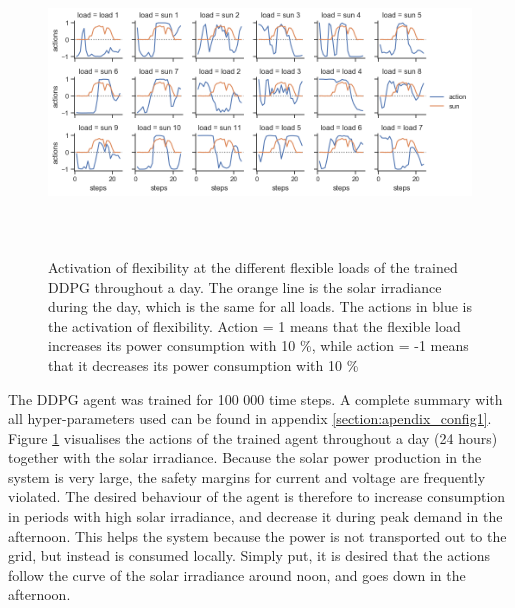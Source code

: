 \documentclass[class=book, crop=false]{standalone}
\begin{document}
\begin{figure}[h]
    \center
    \includegraphics[height=8cm, width=15cm]{figures/configuration1.png}
    \caption[size = 9]{Activation of flexibility at the different flexible loads of the trained DDPG throughout a day. The orange line is the solar irradiance during the day, which is the same for all loads. The actions in blue is the activation of flexibility. Action = 1 means that the flexible load increases its power consumption with 10 \%, while action = -1 means that it decreases its power consumption with 10 \%}
    \label{fig:results:configuration1}
\end{figure}

The DDPG agent was trained for 100 000 time steps. A complete summary with all hyper-parameters used can be found in appendix \ref{section:apendix_config1}. Figure \ref{fig:results:configuration1} visualises the actions of the trained agent throughout a day (24 hours) together with the solar irradiance. Because the solar power production in the system is very large, the safety margins for current and voltage are frequently violated. The desired behaviour of the agent is therefore to increase consumption in periods with high solar irradiance, and decrease it during peak demand in the afternoon. This helps the system because the power is not transported out to the grid, but instead is consumed locally. Simply put, it is desired that the actions follow the curve of the solar irradiance around noon, and goes down in the afternoon. 
\end{document}
